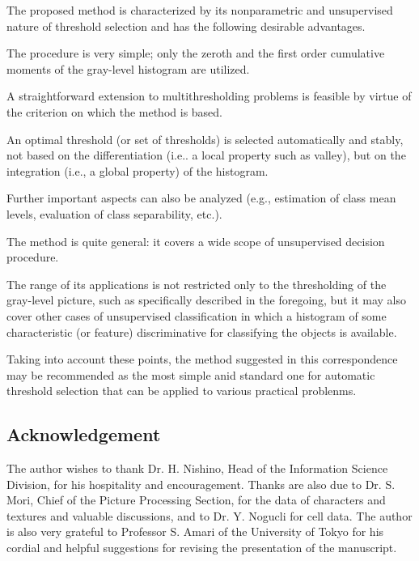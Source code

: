 The proposed method is characterized by its nonparametric and unsupervised nature of threshold selection and has the following desirable advantages.

\begin{asparaenum}[1)]
\item The procedure is very simple; only the zeroth and the first order cumulative moments of the gray-level histogram are utilized.

\item A straightforward extension to multithresholding problems is feasible by virtue of the criterion on which the method is based.

\item An optimal threshold (or set of thresholds) is selected automatically and stably, not based on the differentiation (i.e.. a local property such as valley), but on the integration (i.e., a global property) of the histogram.

\item Further important aspects can also be analyzed (e.g., estimation of class mean levels, evaluation of class separability, etc.).

\item The method is quite general: it covers a wide scope of unsupervised decision procedure.

\end{asparaenum}

The range of its applications is not restricted only to the thresholding of the gray-level picture, such as specifically described in the foregoing, but it may also cover other cases of unsupervised classification in which a histogram of some characteristic (or feature) discriminative for classifying the objects is available.

Taking into account these points, the method suggested in this correspondence may be recommended as the most simple anid standard one for automatic threshold selection that can be applied to various practical problenms.

\subsection*{Acknowledgement}

The author wishes to thank Dr. H. Nishino, Head of the Information Science Division, for his hospitality and encouragement. Thanks are also due to Dr. S. Mori, Chief of the Picture Processing Section, for the data of characters and textures and valuable discussions, and to Dr. Y. Nogucli for cell data. The author is also very grateful to Professor S. Amari of the University of Tokyo for his cordial and helpful suggestions for revising the presentation of the manuscript.

